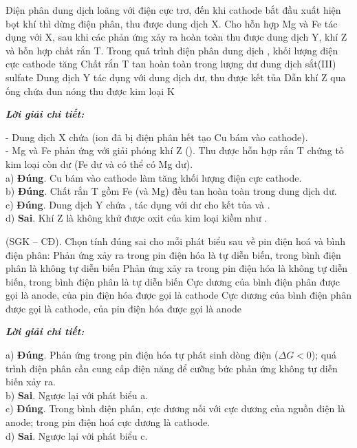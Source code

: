 \documentclass[11pt,a4paper]{article}
\def\loigiai#1{
\par\begingroup\color{blue!80!black}\small
\noindent\textbf{\textit{Lời giải chi tiết:}}\par
#1\par\endgroup}
\begin{document}
\begin{ex}
Điện phân dung dịch  loãng với điện cực trơ, đến khi cathode bắt đầu xuất hiện bọt khí thì dừng điện phân, thu được dung dịch X. Cho hỗn hợp Mg và Fe tác dụng với X, sau khi các phản ứng xảy ra hoàn toàn thu được dung dịch Y, khí Z và hỗn hợp chất rắn T.
\choiceTF
{\True Trong quá trình điện phân dung dịch , khối lượng điện cực cathode tăng}
{\True Chất rắn T tan hoàn toàn trong lượng dư dung dịch sắt(III) sulfate}
{\True Dung dịch Y tác dụng với dung dịch  dư, thu được kết tủa}
{Dẫn khí Z qua ống chứa  đun nóng thu được kim loại K}
\loigiai{
- Dung dịch X chứa  (ion  đã bị điện phân hết tạo Cu bám vào cathode).\\
- Mg và Fe phản ứng với \ce{H2SO4} giải phóng khí Z (\ce{H2}). Thu được hỗn hợp rắn T chứng tỏ kim loại còn dư (Fe dư và có thể có Mg dư).\\
a) \textbf{Đúng}. Cu bám vào cathode làm tăng khối lượng điện cực cathode.\\
b) \textbf{Đúng}. Chất rắn T gồm Fe (và Mg) đều tan hoàn toàn trong dung dịch \ce{Fe2(SO4)3} dư.\\
c) \textbf{Đúng}. Dung dịch Y chứa \ce{Mg^2+}, \ce{Fe^2+} tác dụng với \ce{NaOH} dư cho kết tủa \ce{Mg(OH)2} và \ce{Fe(OH)2}.\\
d) \textbf{Sai}. Khí Z là \ce{H2} không khử được oxit của kim loại kiềm như \ce{K2O}.}
\end{ex}

\begin{ex}
(SGK – CĐ). Chọn tính đúng sai cho mỗi phát biểu sau về pin điện hoá và bình điện phân:
\choiceTF
{\True Phản ứng xảy ra trong pin điện hóa là tự diễn biến, trong bình điện phân là không tự diễn biến}
{Phản ứng xảy ra trong pin điện hóa là không tự diễn biến, trong bình điện phân là tự diễn biến}
{\True Cực dương của bình điện phân được gọi là anode, của pin điện hóa được gọi là cathode}
{Cực dương của bình điện phân được gọi là cathode, của pin điện hóa được gọi là anode}
\loigiai{
a) \textbf{Đúng}. Phản ứng trong pin điện hóa tự phát sinh dòng điện ($\Delta G < 0$); quá trình điện phân cần cung cấp điện năng để cưỡng bức phản ứng không tự diễn biến xảy ra.\\
b) \textbf{Sai}. Ngược lại với phát biểu a.\\
c) \textbf{Đúng}. Trong bình điện phân, cực dương nối với cực dương của nguồn điện là anode; trong pin điện hoá cực dương là cathode.\\
d) \textbf{Sai}. Ngược lại với phát biểu c.}
\end{ex}
\end{document}
